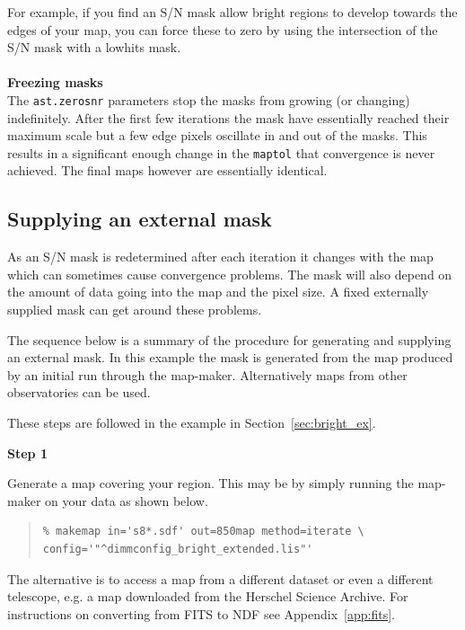 \documentclass[twoside,11pt]{article}
\newcommand{\htmlref}[2]{#1}
\newcommand{\latexhtml}[2]{#1}
\newcommand{\xlabel}[1]{}
\renewcommand{\_}{\texttt{\symbol{95}}}
\newenvironment{myquote}{
   \color{MidnightBlue}\begin{quote}\begin{small}}{
   \end{small}\end{quote}
}
\newcommand{\param}[1]{\texttt{#1}}
\newcommand{\cref}[3]{\latexhtml{#1~\ref{#2}}{\htmlref{#3}{#2}}}
\renewenvironment{myquote}{
      \begin{quote}\begin{small}}{
      \end{small}\end{quote}
   }
\begin{document}
For example, if you find an S/N mask allow bright regions to develop
towards the edges of your map, you can force these to zero by using
the intersection of the S/N mask with a lowhits mask.
\\\\
\textbf{Freezing masks}\\
The \param{ast.zero\_snr} parameters stop the masks from growing
(or changing) indefinitely. After the first few iterations the mask
have essentially reached their maximum scale but a few edge pixels
oscillate in and out of the masks. This results in a significant enough
change in the \param{maptol} that convergence is never achieved. The
final maps however are essentially identical.


\subsection{\xlabel{maskbe}Supplying an external mask}
\label{sec:maskbe}

As an S/N mask is redetermined after each iteration it changes with the map
 which can sometimes cause convergence problems. The mask
will also depend on the amount of data going into the map and the
pixel size. A fixed externally supplied mask  can get around these problems.

The sequence below is a summary of the procedure for generating and
supplying an external mask. In this example the mask is generated from
the map produced by an initial run through the map-maker.
Alternatively maps from other observatories can be used.

These steps are followed in the example in
\cref{Section}{sec:bright_ex}{Extended galactic sources}.

\begin{minipage}[t]{0.1\linewidth}
\textbf{Step 1}
\end{minipage}
\begin{minipage}[t]{0.9\linewidth}Generate a map covering your region. This
may be by simply running the map-maker on your data as shown below.
\begin{myquote}
\begin{verbatim}
% makemap in='s8*.sdf' out=850map method=iterate \
config='"^dimmconfig_bright_extended.lis"'
\end{verbatim}
\end{myquote}
The alternative is to access a map from a different dataset or even a
different telescope, e.g. a map downloaded from the Herschel Science
Archive. For instructions on converting from FITS to NDF see
\cref{Appendix}{app:fits}{Convert format from FITS to NDF}.\\
\end{minipage}
\end{document}
